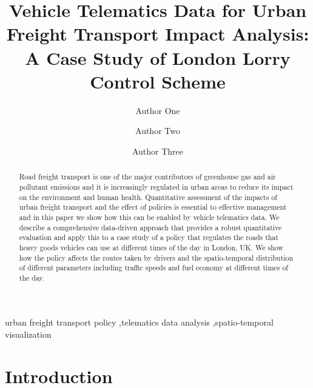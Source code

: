 \documentclass[preprint,12pt,3p]{elsarticle}
\begin{document}
\begin{frontmatter}


\title{Vehicle Telematics Data for Urban Freight Transport Impact Analysis: A Case Study of London Lorry Control Scheme}

\author[label1,label2]{Author One}
\address[label1]{Address One}
\address[label2]{Address Two}





\author[label5]{Author Two}
\address[label5]{Some University}

\author[label1,label5]{Author Three}

\begin{abstract}
Road freight transport is one of the major contributors of greenhouse gas and air pollutant emissions and it is increasingly regulated in urban areas to reduce its impact on the environment and human health. Quantitative assessment of the impacts of urban freight transport and the effect of policies is essential to effective management and in this paper we show how this can be enabled by vehicle telematics data. We describe a comprehensive data-driven approach that provides a robust quantitative  evaluation and apply this to a case study of a policy that regulates the roads that heavy goods vehicles can use at different times of the day in London, UK. We show how the policy affects the routes taken by drivers and the spatio-temporal distribution of different parameters including traffic speeds and fuel economy at different times of the day.


\end{abstract}

\begin{keyword}
urban freight transport policy \sep telematics data analysis \sep spatio-temporal visualization
\end{keyword}

\end{frontmatter}



\section{Introduction}
\label{introduction}
\end{document}
